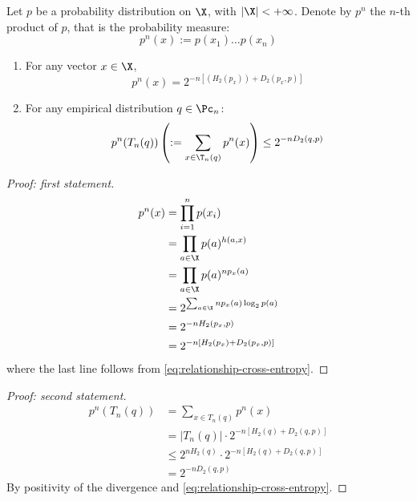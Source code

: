 \documentclass[toc]{../cs-classes/cs-classes}
\begin{document}
\begin{lemma}
    Let $p$ be a probability distribution on $\X$, with $|\X|<+\infty$. Denote by $p^n$ the $n$-th product of $p$, that is the probability measure:
    \begin{equation*}
        p^n(x) := p(x_1)\dots p(x_n)
    \end{equation*}
    \begin{enumerate}
        \item For any vector $x\in\X$,
        \begin{equation*}
            p^n(x) = 2^{-n\left[(H_2(p_x))+D_2(p_x, p)\right]}
        \end{equation*}
        \item For any empirical distribution $q\in\Pc_n$:
        \begin{equation*}
            p^n(T_n(q)) \left(:=\sum_{x\in\T_n(q)} p^n(x)\right) \leq 2^{-nD_2(q, p)}
        \end{equation*}
    \end{enumerate}
\end{lemma}
\begin{proof}[Proof: first statement]
    \begin{equation*}
        \begin{aligned}
            p^n(x)&=\prod_{i=1}^n p(x_i)\\
            &= \prod_{a\in\X} p(a)^{h(a, x)}\\
            &= \prod_{a\in\X} p(a)^{np_x(a)}\\
            &= 2^{\sum_{a\in\X}np_x(a)\log_2 p(a)}\\
            &= 2^{-nH_2(p_x, p)}\\
            &= 2^{-n\left[H_2(p_x)+D_2(p_x, p)\right]}
        \end{aligned}
    \end{equation*}
    where the last line follows from \eqref{eq:relationship-cross-entropy}.
\end{proof}
\begin{proof}[Proof: second statement]
    \begin{equation*}
        \begin{aligned}
            p^n(T_n(q))&=\sum_{x\in T_n(q)}p^n(x)\\
            &= |T_n(q)|\cdot 2^{-n\left[H_2(q)+D_2(q, p)\right]}\\
            &\leq 2^{nH_2(q)} \cdot 2^{-n[H_2(q)+D_2(q, p)]}\\
            &= 2^{-nD_2(q, p)}
        \end{aligned}
    \end{equation*}
    By positivity of the divergence and \eqref{eq:relationship-cross-entropy}.
\end{proof}
\end{document}
